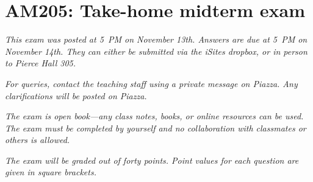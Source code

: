 \documentclass[11pt]{article}
\begin{document}
\section*{AM205: Take-home midterm exam}
\textit{This exam was posted at 5~PM on November 13th. Answers are due at 5~PM
on November 14th. They can either be submitted via the iSites dropbox, or in
person to Pierce Hall 305.}

\vspace{0.5em}
\noindent\textit{For queries, contact the teaching staff using a private
message on Piazza. Any clarifications will be posted on Piazza.}

\vspace{0.5em}
\noindent\textit{The exam is open book---any class notes, books, or online
resources can be used. The exam must be completed by yourself and no
collaboration with classmates or others is allowed.}

\vspace{0.5em}
\noindent\textit{The exam will be graded out of forty points. Point values
for each question are given in square brackets.}
\end{document}
